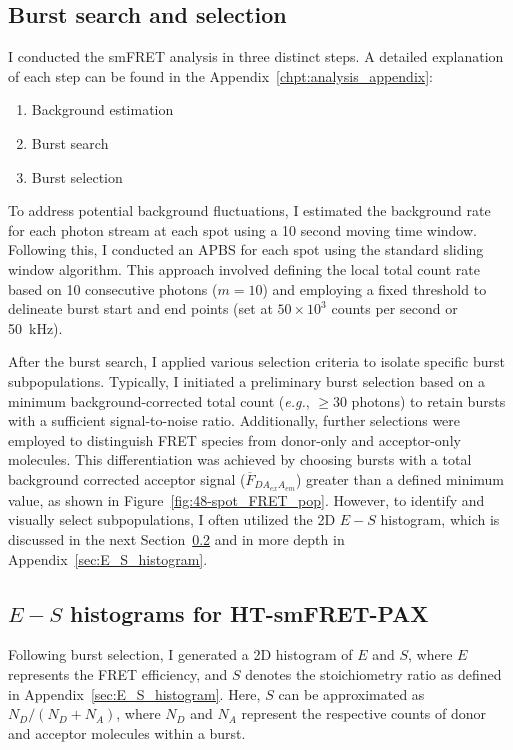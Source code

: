 \subsection{Burst search and selection}
\label{sec:burst_search_and_selection_PAX_analysis}

I conducted the \ac{smFRET} analysis in three distinct steps.
A detailed explanation of each step can be found in the  Appendix~\ref{chpt:analysis_appendix}:

\begin{enumerate}
\item Background estimation
\item Burst search
\item Burst selection
\end{enumerate}

To address potential background fluctuations, I estimated the background rate for each photon stream at each spot using a 10 second moving time window. 
Following this, I conducted an \ac{APBS} for each spot using the standard sliding window algorithm. 
This approach involved defining the local total count rate based on 10 consecutive photons ($m=10$) and employing a fixed threshold to delineate burst start and end points (set at $50\times 10^{3}$ counts per second or 50~kHz).

After the burst search, I applied various selection criteria to isolate specific burst subpopulations. 
Typically, I initiated a preliminary burst selection based on a minimum background-corrected total count (\textit{e.g.}, $\geq 30$ photons) to retain bursts with a sufficient signal-to-noise ratio. 
Additionally, further selections were employed to distinguish FRET species from donor-only and acceptor-only molecules. 
This differentiation was achieved by choosing bursts with a total background corrected acceptor signal ($\overline{F}_{DA_{ex}A_{em}}$) greater than a defined minimum value, as shown in Figure~\ref{fig:48-spot_FRET_pop}. 
However, to identify and visually select subpopulations, I often utilized the 2D $E-S$ histogram, which is discussed in the next Section~\ref{sec:Epr_Su_PAX} and in more depth in Appendix~\ref{sec:E_S_histogram}.

\subsection{$E - S$ histograms for HT-smFRET-PAX}
\label{sec:Epr_Su_PAX}

Following burst selection, I generated a 2D histogram of $E$ and $S$, where $E$ represents the FRET efficiency, and $S$ denotes the stoichiometry ratio as defined in Appendix~\ref{sec:E_S_histogram}. 
Here, $S$ can be approximated as $N_D / (N_D + N_A)$, where $N_D$ and $N_A$ represent the respective counts of donor and acceptor molecules within a burst.

